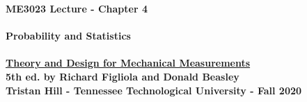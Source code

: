 \documentclass[11pt]{article}
\newcommand{\NUM}{4}
\begin{document}
\textbf{ \LARGE ME3023 Lecture -  Chapter \NUM \\\\ \hspace*{5mm} Probability and Statistics} \\\\
\textbf{ \hspace*{5mm}\underline{Theory and Design for Mechanical Measurements}\vspace{1mm}\\ 
                \hspace*{5mm} 5th ed. by Richard Figliola and Donald Beasley}\vspace{3mm}\\
\textbf{ \hspace*{5mm}Tristan Hill - Tennessee Technological University -  Fall 2020} \vspace{3mm}\\
\end{document}
